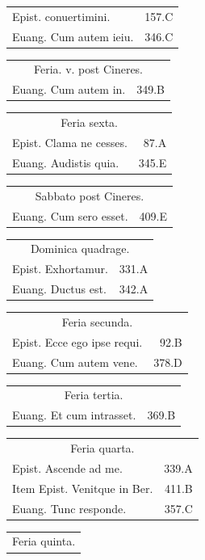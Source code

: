 \documentclass[a5paper,10pt]{book}
\begin{document}
\begin{multicols}{2}
\begin{tabular}{l r}
Epist. conuertimini. & 157.C\\
Euang. Cum autem ieiu. & 346.C\\
\end{tabular}
\begin{tabular}{l r}
\multicolumn{2}{c}{\color{red} Feria. v. post Cineres.}\\
Euang. Cum autem in. & 349.B\\
\end{tabular}
\begin{tabular}{l r}
\multicolumn{2}{c}{\color{red} Feria sexta.}\\
Epist. Clama ne cesses. & 87.A\\
Euang. Audistis quia. & 345.E\\
\end{tabular}
\begin{tabular}{l r}
\multicolumn{2}{c}{\color{red} Sabbato post Cineres.}\\
Euang. Cum sero esset. & 409.E\\
\end{tabular}
\begin{tabular}{l r}
\multicolumn{2}{c}{\color{red} Dominica quadrage.}\\
Epist. Exhortamur. & 331.A\\
Euang. Ductus est. & 342.A\\
\end{tabular}
\begin{tabular}{l r}
\multicolumn{2}{c}{\color{red} Feria secunda.}\\
Epist. Ecce ego ipse requi. & 92.B\\
Euang. Cum autem vene. & 378.D\\
\end{tabular}
\begin{tabular}{l r}
\multicolumn{2}{c}{\color{red} Feria tertia.}\\
Euang. Et cum intrasset. & 369.B\\
\end{tabular}
\begin{tabular}{l r}
\multicolumn{2}{c}{\color{red} Feria quarta.}\\
Epist. Ascende ad me. & 339.A\\
Item Epist. Venitque in Ber. & 411.B\\
Euang. Tunc responde. & 357.C\\
\end{tabular}
\begin{tabular}{l r}
\multicolumn{2}{c}{\color{red} Feria quinta.}\\

\end{tabular}
\end{multicols}
\end{document}
